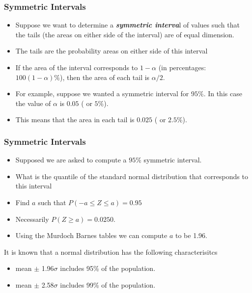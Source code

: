 \documentclass[a4]{beamer}
\begin{document}
\begin{frame}
\frametitle{Symmetric Intervals}

\begin{itemize}
\item Suppose we want to determine a \textbf{\emph{symmetric interva}}l of values such that the tails (the areas on either side of the interval) are of equal dimension. 
\item The tails are the probability areas on either side of this interval
\item If the area of the interval corresponds to $1-\alpha$ (in percentages: $100(1-\alpha)\%$), then the area of each tail is $\alpha/2$.
\item For example, suppose we wanted a symmetric interval for $95\%$. In this case the value of $\alpha$ is $0.05$ ( or $5\%$).
\item This means that the area in each tail is $0.025$  ( or $2.5\%$).
\end{itemize}
\end{frame}
\begin{frame}
\frametitle{Symmetric Intervals}
\begin{itemize}
\item Supposed we are asked to compute a $95 \% $ symmetric interval.
\item What is the quantile of the standard normal distribution that corresponds to this interval
\item Find $a$ such that $P(-a \leq Z \leq a) = 0.95$
\item Necessarily $P(Z \geq a) = 0.0250$. 
\item Using the Murdoch Barnes tables we can compute $a$ to be 1.96.
\end{itemize}
\end{frame}
\begin{frame}
It is known that a normal distribution has the following characterisitcs
\begin{itemize}
\item mean $\pm$ 1.96$\sigma$ includes 95\% of the population.
\item mean $\pm$ 2.58$\sigma$ includes 99\% of the population.
\end{itemize}
\end{frame}
\end{document}
